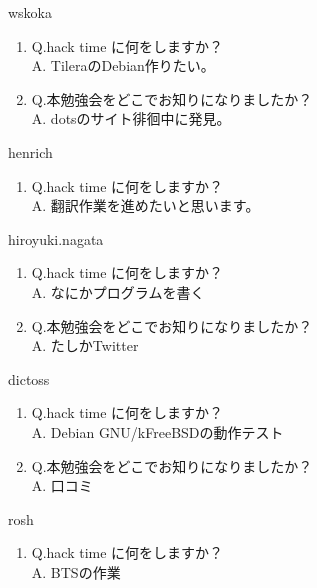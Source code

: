 \begin{prework}{ wskoka }
  \begin{enumerate}
  \item Q.hack time に何をしますか？\\
    A. TileraのDebian作りたい。
  \item Q.本勉強会をどこでお知りになりましたか？\\
    A. dotsのサイト徘徊中に発見。
  \end{enumerate}
\end{prework}

\begin{prework}{ henrich }
  \begin{enumerate}
  \item Q.hack time に何をしますか？\\
    A. 翻訳作業を進めたいと思います。
  \end{enumerate}
\end{prework}

\begin{prework}{ hiroyuki.nagata }
  \begin{enumerate}
  \item Q.hack time に何をしますか？\\
    A. なにかプログラムを書く
  \item Q.本勉強会をどこでお知りになりましたか？\\
    A. たしかTwitter
  \end{enumerate}
\end{prework}

\begin{prework}{ dictoss }
  \begin{enumerate}
  \item Q.hack time に何をしますか？\\
    A. Debian GNU/kFreeBSDの動作テスト
  \item Q.本勉強会をどこでお知りになりましたか？\\
    A. 口コミ
  \end{enumerate}
\end{prework}

\begin{prework}{ rosh }
  \begin{enumerate}
  \item Q.hack time に何をしますか？\\
    A. BTSの作業
  \end{enumerate}
\end{prework}

